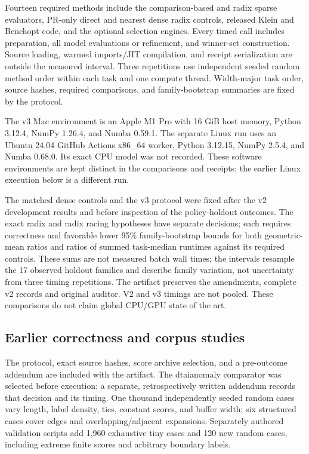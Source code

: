 \documentclass[10pt]{article}
\begin{document}
Fourteen required methods include the comparison-based and radix sparse
evaluators, PR-only direct and nearest dense radix controls, released Klein
and Benchopt code, and the optional selection engines. Every timed call
includes preparation, all model evaluations or refinement, and winner-set
construction. Source loading, warmed imports/JIT compilation, and receipt
serialization are outside the measured interval. Three repetitions use
independent seeded random method order within each task and one compute
thread. Width-major task order, source hashes, required comparisons, and
family-bootstrap summaries are fixed by the protocol.

The v3 Mac environment is an Apple M1 Pro with 16 GiB host memory,
Python 3.12.4, NumPy 1.26.4, and Numba 0.59.1. The separate Linux run uses
an Ubuntu 24.04 GitHub Actions x86\_64 worker, Python 3.12.15,
NumPy 2.5.4, and Numba 0.68.0. Its exact CPU model was not recorded.
These software environments are kept distinct in the comparisons and
receipts; the earlier Linux execution below is a different run.

The matched dense controls and the v3 protocol were fixed after the v2
development results and before inspection of the policy-holdout outcomes.
The exact radix and radix racing hypotheses have separate decisions; each
requires correctness and favorable lower 95\% family-bootstrap bounds for
both geometric-mean ratios and ratios of summed task-median runtimes
against its required controls. These sums are not measured batch wall
times; the intervals resample the 17 observed holdout families and describe
family variation, not uncertainty from three timing repetitions. The artifact
preserves the amendments, complete v2 records and
original auditor. V2 and v3 timings are not pooled. These comparisons do not
claim global CPU/GPU state of the art.

\subsection{Earlier correctness and corpus studies}
The protocol, exact source hashes, score archive selection, and a pre-outcome
addendum are included with the artifact. The dtaianomaly comparator was selected
before execution; a separate, retrospectively written addendum records that
decision and its timing. One thousand independently seeded
random cases vary length, label density, ties, constant scores, and buffer
width; six structured cases cover edges and overlapping/adjacent expansions.
Separately authored validation scripts add 1,960 exhaustive tiny cases and 120 new random
cases, including extreme finite scores and arbitrary boundary labels.
\end{document}
